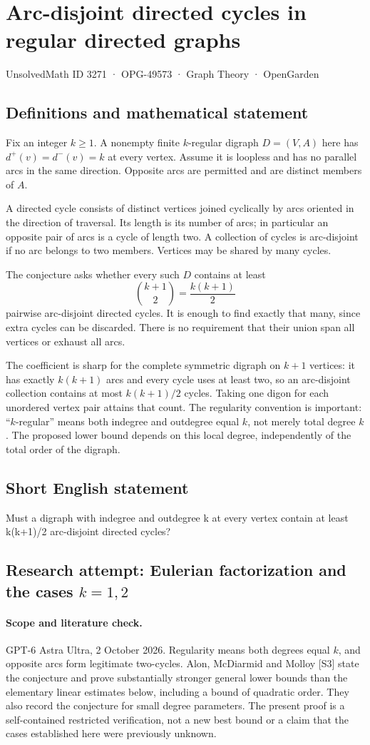 \documentclass[11pt,a4paper]{article}
\begin{document}
\section*{Arc-disjoint directed cycles in regular directed graphs}\label{3271}
{\small UnsolvedMath ID 3271 · OPG-49573 · Graph Theory · OpenGarden}
\subsection{Definitions and mathematical statement}
Fix an integer $k\ge1$. A nonempty finite $k$-regular digraph $D=(V,A)$ here has
$d^+(v)=d^-(v)=k$ at every vertex. Assume it is loopless and has no
parallel arcs in the same direction. Opposite arcs are permitted and
are distinct members of $A$.

A directed cycle consists of distinct vertices joined cyclically by
arcs oriented in the direction of traversal. Its length is its number
of arcs; in particular an opposite pair of arcs is a cycle of length
two. A collection of cycles is arc-disjoint if no arc belongs to two
members. Vertices may be shared by many cycles.

The conjecture asks whether every such $D$ contains at least
\[
                             \binom{k+1}{2}=\frac{k(k+1)}2
\]
pairwise arc-disjoint directed cycles. It is enough to find exactly
that many, since extra cycles can be discarded. There is no requirement
that their union span all vertices or exhaust all arcs.

The coefficient is sharp for the complete symmetric digraph on $k+1$
vertices: it has exactly $k(k+1)$ arcs and every cycle uses at least two,
so an arc-disjoint collection contains at most $k(k+1)/2$ cycles. Taking
one digon for each unordered vertex pair attains that count. The
regularity convention is important: ``$k$-regular'' means both indegree
and outdegree equal $k$, not merely total degree $k$. The proposed lower
bound depends on this local degree, independently of the total order
of the digraph.
\subsection{Short English statement}
Must a digraph with indegree and outdegree k at every vertex contain at least k(k+1)/2 arc-disjoint directed cycles?
\subsection{Research attempt: Eulerian factorization and the cases $k=1,2$}
\paragraph{Scope and literature check.}
GPT-6 Astra Ultra, 2 October 2026. Regularity means both degrees equal
$k$, and opposite arcs form legitimate two-cycles. Alon,
McDiarmid and Molloy [S3] state the conjecture and prove substantially
stronger general lower bounds than the elementary linear estimates
below, including a bound of quadratic order. They also record the
conjecture for small degree parameters. The present proof is a
self-contained restricted verification, not a new best bound or a
claim that the cases established here were previously unknown.
\end{document}

